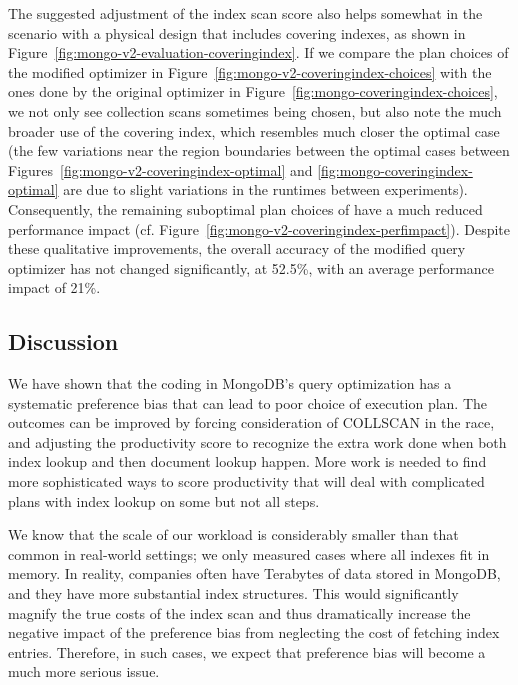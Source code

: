 The suggested adjustment of the index scan score also helps somewhat in the scenario with a physical design that includes covering indexes, as shown in Figure~\ref{fig:mongo-v2-evaluation-coveringindex}. If we compare the plan choices of the modified \approachName optimizer in Figure~\ref{fig:mongo-v2-coveringindex-choices} with the ones done by the original \relname optimizer in Figure~\ref{fig:mongo-coveringindex-choices}, we not only see collection scans sometimes being chosen, but also note the much broader use of the covering index, which resembles much closer the optimal case (the few variations near the region boundaries between the optimal cases between Figures~\ref{fig:mongo-v2-coveringindex-optimal} and \ref{fig:mongo-coveringindex-optimal} are due to slight variations in the runtimes between experiments). %
Consequently, the remaining suboptimal plan choices of \approachName have a much reduced performance impact (cf. Figure~\ref{fig:mongo-v2-coveringindex-perfimpact}).
Despite these qualitative improvements, the overall accuracy of the modified query optimizer has not changed significantly, at 52.5\%, with an average performance impact of 21\%. 


\subsection{Discussion}
We have shown that the coding in MongoDB's \approachName query optimization has a systematic preference bias that can lead to poor choice of execution plan. The outcomes can be improved by forcing consideration of COLLSCAN in the race, and adjusting the productivity score to recognize the extra work done 
when both index lookup and then document lookup happen. More work is needed to find more sophisticated ways to score productivity that will deal with complicated plans with index lookup on some but not all steps. 

We know that the scale of our workload is considerably smaller than that common in real-world settings; we only measured cases where all indexes fit in memory. In reality, companies often have Terabytes of data stored in MongoDB, and they have more substantial index structures. This would significantly magnify the true costs of the index scan and thus dramatically increase the negative impact of the preference bias from neglecting the cost of fetching index entries. Therefore, in such cases, we expect that preference bias will become a much more serious issue. 

